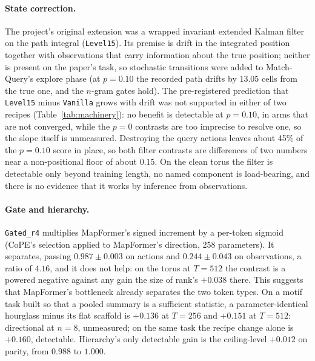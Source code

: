 \documentclass[10pt]{article}
\newcommand{\arm}[1]{\texttt{#1}}
\begin{document}
\paragraph{State correction.} The project's original extension was a wrapped invariant extended Kalman filter on the
path integral (\arm{Level15}). Its premise is drift in the integrated position together with observations that carry
information about the true position; neither is present on the paper's task, so stochastic transitions were added to
Match-Query's explore phase (at $p=0.10$ the recorded path drifts by $13.05$ cells from the true one, and the
$n$-gram gates hold). The pre-registered prediction that \arm{Level15} minus \arm{Vanilla} grows with drift was not
supported in either of two recipes (Table~\ref{tab:machinery}): no benefit is detectable at $p=0.10$, in arms that
are not converged, while the $p=0$ contrasts are too imprecise to resolve one, so the slope itself is unmeasured. Destroying the query actions leaves about 45\% of the $p=0.10$ score in place, so both
filter contrasts are differences of two numbers near a non-positional floor of about $0.15$. On the clean torus the
filter is detectable only beyond training length, no named component is load-bearing, and there is no evidence that
it works by inference from observations.

\paragraph{Gate and hierarchy.} \arm{Gated\_r4} multiplies MapFormer's signed increment by a per-token sigmoid
(CoPE's selection applied to MapFormer's direction, 258 parameters). It separates, passing $0.987\pm0.003$ on actions
and $0.244\pm0.043$ on observations, a ratio of $4.16$, and it does not help: on the torus at $T=512$ the contrast is
a powered negative against any gain the size of rank's $+0.038$ there. This suggests that MapFormer's bottleneck
already separates the two token types. On a motif task built so that a pooled summary is a sufficient statistic, a
parameter-identical hourglass minus its flat scaffold is $+0.136$ at $T=256$ and $+0.151$ at $T=512$: directional at
$n=8$, unmeasured; on the same task the recipe change alone is $+0.160$, detectable. Hierarchy's only detectable gain is the ceiling-level $+0.012$ on parity, from $0.988$ to $1.000$.
\end{document}
